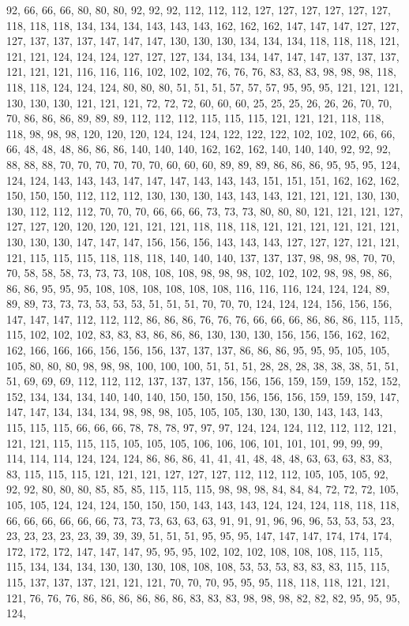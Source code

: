92, 66, 66, 66, 80, 80, 80, 92, 92, 92, 112, 112, 112, 127, 127, 127, 127, 127, 127, 118, 118, 118, 134, 134, 134, 143, 143, 143, 162, 162, 162, 147, 147, 147, 127, 127, 127, 137, 137, 137, 147, 147, 147, 130, 130, 130, 134, 134, 134, 118, 118, 118, 121, 121, 121, 124, 124, 124, 127, 127, 127, 134, 134, 134, 147, 147, 147, 137, 137, 137, 121, 121, 121, 116, 116, 116, 102, 102, 102, 76, 76, 76, 83, 83, 83, 98, 98, 98, 118, 118, 118, 124, 124, 124, 80, 80, 80, 51, 51, 51, 57, 57, 57, 95, 95, 95, 121, 121, 121, 130, 130, 130, 121, 121, 121, 72, 72, 72, 60, 60, 60, 25, 25, 25, 26, 26, 26, 70, 70, 70, 86, 86, 86, 89, 89, 89, 112, 112, 112, 115, 115, 115, 121, 121, 121, 118, 118, 118, 98, 98, 98, 120, 120, 120, 124, 124, 124, 122, 122, 122, 102, 102, 102, 66, 66, 66, 48, 48, 48, 86, 86, 86, 140, 140, 140, 162, 162, 162, 140, 140, 140, 92, 92, 92, 88, 88, 88, 70, 70, 70, 70, 70, 70, 60, 60, 60, 89, 89, 89, 86, 86, 86, 95, 95, 95, 124, 124, 124, 143, 143, 143, 147, 147, 147, 143, 143, 143, 151, 151, 151, 162, 162, 162, 150, 150, 150, 112, 112, 112, 130, 130, 130, 143, 143, 143, 121, 121, 121, 130, 130, 130, 112, 112, 112, 70, 70, 70, 66, 66, 66, 73, 73, 73, 80, 80, 80, 121, 121, 121, 127, 127, 127, 120, 120, 120, 121, 121, 121, 118, 118, 118, 121, 121, 121, 121, 121, 121, 130, 130, 130, 147, 147, 147, 156, 156, 156, 143, 143, 143, 127, 127, 127, 121, 121, 121, 115, 115, 115, 118, 118, 118, 140, 140, 140, 137, 137, 137, 98, 98, 98, 70, 70, 70, 58, 58, 58, 73, 73, 73, 108, 108, 108, 98, 98, 98, 102, 102, 102, 98, 98, 98, 86, 86, 86, 95, 95, 95, 108, 108, 108, 108, 108, 108, 116, 116, 116, 124, 124, 124, 89, 89, 89, 73, 73, 73, 53, 53, 53, 51, 51, 51, 70, 70, 70, 124, 124, 124, 156, 156, 156, 147, 147, 147, 112, 112, 112, 86, 86, 86, 76, 76, 76, 66, 66, 66, 86, 86, 86, 115, 115, 115, 102, 102, 102, 83, 83, 83, 86, 86, 86, 130, 130, 130, 156, 156, 156, 162, 162, 162, 166, 166, 166, 156, 156, 156, 137, 137, 137, 86, 86, 86, 95, 95, 95, 105, 105, 105, 80, 80, 80, 98, 98, 98, 100, 100, 100, 51, 51, 51, 28, 28, 28, 38, 38, 38, 51, 51, 51, 69, 69, 69, 112, 112, 112, 137, 137, 137, 156, 156, 156, 159, 159, 159, 152, 152, 152, 134, 134, 134, 140, 140, 140, 150, 150, 150, 156, 156, 156, 159, 159, 159, 147, 147, 147, 134, 134, 134, 98, 98, 98, 105, 105, 105, 130, 130, 130, 143, 143, 143, 115, 115, 115, 66, 66, 66, 78, 78, 78, 97, 97, 97, 124, 124, 124, 112, 112, 112, 121, 121, 121, 115, 115, 115, 105, 105, 105, 106, 106, 106, 101, 101, 101, 99, 99, 99, 114, 114, 114, 124, 124, 124, 86, 86, 86, 41, 41, 41, 48, 48, 48, 63, 63, 63, 83, 83, 83, 115, 115, 115, 121, 121, 121, 127, 127, 127, 112, 112, 112, 105, 105, 105, 92, 92, 92, 80, 80, 80, 85, 85, 85, 115, 115, 115, 98, 98, 98, 84, 84, 84, 72, 72, 72, 105, 105, 105, 124, 124, 124, 150, 150, 150, 143, 143, 143, 124, 124, 124, 118, 118, 118, 66, 66, 66, 66, 66, 66, 73, 73, 73, 63, 63, 63, 91, 91, 91, 96, 96, 96, 53, 53, 53, 23, 23, 23, 23, 23, 23, 39, 39, 39, 51, 51, 51, 95, 95, 95, 147, 147, 147, 174, 174, 174, 172, 172, 172, 147, 147, 147, 95, 95, 95, 102, 102, 102, 108, 108, 108, 115, 115, 115, 134, 134, 134, 130, 130, 130, 108, 108, 108, 53, 53, 53, 83, 83, 83, 115, 115, 115, 137, 137, 137, 121, 121, 121, 70, 70, 70, 95, 95, 95, 118, 118, 118, 121, 121, 121, 76, 76, 76, 86, 86, 86, 86, 86, 86, 83, 83, 83, 98, 98, 98, 82, 82, 82, 95, 95, 95, 124, 